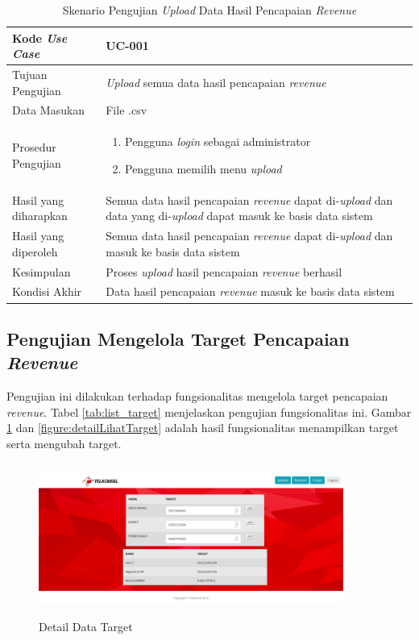 \begin{table}[h!]
	\centering
	\begin{tabular}{|p{4cm}|p{6cm}|}
	\hline
	Kode \textit{Use Case} & UC-001\\ \hline
	Tujuan Pengujian & \textit{Upload} semua data hasil pencapaian \textit{revenue}\\ \hline
	Data Masukan & File .csv \\ \hline
	Prosedur Pengujian & 
		\begin{enumerate}
		\item Pengguna \textit{login} sebagai administrator
		\item Pengguna memilih menu \textit{upload}
		\end{enumerate}\\ \hline
	Hasil yang diharapkan & Semua data hasil pencapaian \textit{revenue} dapat di-\textit{upload} dan data yang di-\textit{upload} dapat masuk ke basis data sistem \\ \hline
	Hasil yang diperoleh & Semua data hasil pencapaian \textit{revenue} dapat di-\textit{upload} dan masuk ke basis data sistem \\ \hline
	Kesimpulan & Proses \textit{upload} hasil pencapaian \textit{revenue} berhasil \\ \hline
	Kondisi Akhir & Data hasil pencapaian \textit{revenue} masuk ke basis data sistem\\ \hline
	\end{tabular}\caption{Skenario Pengujian \textit{Upload} Data Hasil Pencapaian \textit{Revenue}}
	\label{tab:list_upload}
\end{table}

\subsection{Pengujian Mengelola Target Pencapaian \textit{Revenue}}
Pengujian ini dilakukan terhadap fungsionalitas mengelola target pencapaian \textit{revenue}. Tabel \ref{tab:list_target} menjelaskan pengujian fungsionalitas ini. Gambar \ref{figure:lihatTarget} dan \ref{figure:detailLihatTarget} adalah hasil fungsionalitas menampilkan target serta mengubah target.

\begin{figure}[h!]
\centerline
{\includegraphics[width=10cm,height=5cm]{bab6/halamanTarget.png}}
\caption{Detail Data Target}
\label{figure:lihatTarget}
\end{figure}

